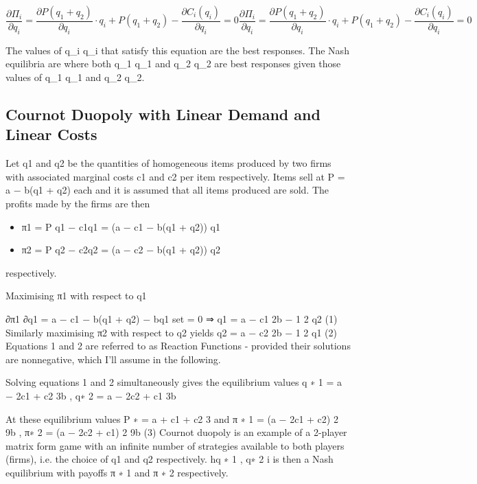 \[{\displaystyle {\frac {\partial \Pi _{i}}{\partial q_{i}}}={\frac {\partial P(q_{1}+q_{2})}{\partial q_{i}}}\cdot q_{i}+P(q_{1}+q_{2})-{\frac {\partial C_{i}(q_{i})}{\partial q_{i}}}=0} {\frac  {\partial \Pi _{i}}{\partial q_{i}}}={\frac  {\partial P(q_{1}+q_{2})}{\partial q_{i}}}\cdot q_{i}+P(q_{1}+q_{2})-{\frac  {\partial C_{i}(q_{i})}{\partial q_{i}}}=0\]

The values of {\displaystyle q_{i}} q_{i} that satisfy this equation are the best responses. The Nash equilibria are where both {\displaystyle q_{1}} q_{1} and {\displaystyle q_{2}} q_{2} are best responses given those values of {\displaystyle q_{1}} q_{1} and {\displaystyle q_{2}} q_{2}.

\subsection{Cournot Duopoly with Linear Demand and Linear Costs}
Let q1 and q2 be the quantities of homogeneous items produced by two firms with associated
marginal costs c1 and c2 per item respectively.
Items sell at P = a − b(q1 + q2) each and it is assumed that all items produced are sold.
The profits made by the firms are then
\begin{itemize}
\item π1 = P q1 − c1q1 = (a − c1 − b(q1 + q2)) q1
\item π2 = P q2 − c2q2 = (a − c2 − b(q1 + q2)) q2
\end{itemize}
respectively.


Maximising π1 with respect to q1

∂π1
∂q1
= a − c1 − b(q1 + q2) − bq1
set = 0
⇒ q1 =
a − c1
2b
−
1
2
q2 (1)
Similarly maximising π2 with respect to q2 yields
q2 =
a − c2
2b
−
1
2
q1 (2)
Equations 1 and 2 are referred to as Reaction Functions - provided their solutions are
nonnegative, which I’ll assume in the following.

Solving equations 1 and 2 simultaneously gives the equilibrium values
q
∗
1 =
a − 2c1 + c2
3b
, q∗
2 =
a − 2c2 + c1
3b

At these equilibrium values
P
∗ =
a + c1 + c2
3
and
π
∗
1 =
(a − 2c1 + c2)
2
9b
, π∗
2 =
(a − 2c2 + c1)
2
9b
(3)
Cournot duopoly is an example of a 2-player matrix form game with an infinite number
of strategies available to both players (firms), i.e. the choice of q1 and q2 respectively.
hq
∗
1
, q∗
2
i is then a Nash equilibrium with payoffs π
∗
1
and π
∗
2
respectively.




